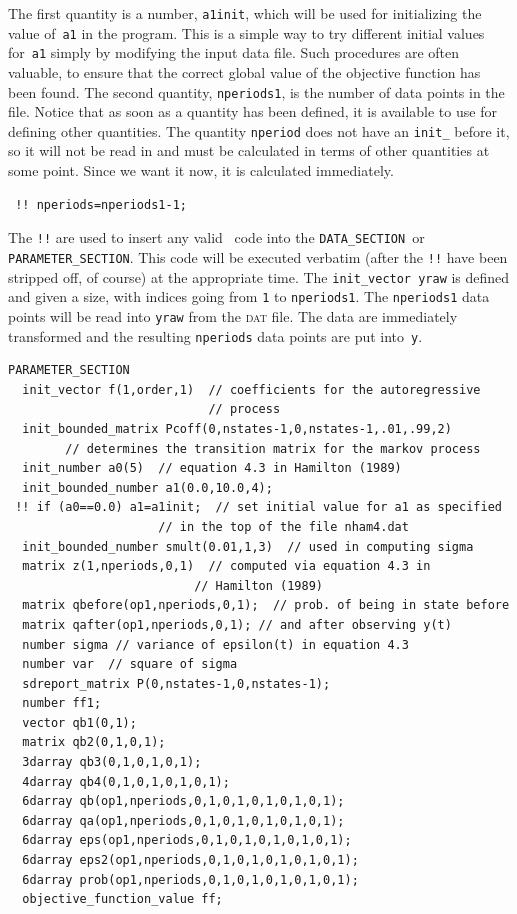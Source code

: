 \documentclass{admbmanual}
\newcommand\DS{\texttt{DATA\_SECTION}}
\newcommand\PS{\texttt{PARAMETER\_SECTION}}
\begin{document}
The first quantity is a number, \texttt{a1init}, which will be used for
initializing the value of~\texttt{a1} in the program. This is a simple way to
try different initial values for~\texttt{a1} simply by modifying the input data
file. Such procedures are often valuable, to ensure that the correct global
value of the objective function has been found. The second quantity,
\texttt{nperiods1}, is the number of data points in the file. Notice that as
soon as a quantity has been defined, it is available to use for defining other
quantities. The quantity \texttt{nperiod} does not have an \texttt{init\_}
before it, so it will not be read in and must be calculated in terms of other
quantities at some point. Since we want it now, it is calculated immediately.
\begin{lstlisting}
 !! nperiods=nperiods1-1;
\end{lstlisting}
The \texttt{!!} are used to insert any valid \cplus\ code into the \DS\ or
\PS. %
This code will be executed verbatim (after the \texttt{!!} have been stripped
off, of course) at the appropriate time. The \texttt{init\_vector yraw} is
defined and given a size, with indices going from \texttt{1} to
\texttt{nperiods1}. The \texttt{nperiods1} data points will be read into
\texttt{yraw} from the \textsc{dat} file. The data are immediately transformed
and the resulting \texttt{nperiods} data points are put into~\texttt{y}.
\begin{lstlisting}
PARAMETER_SECTION
  init_vector f(1,order,1)  // coefficients for the autoregressive
                            // process
  init_bounded_matrix Pcoff(0,nstates-1,0,nstates-1,.01,.99,2)
        // determines the transition matrix for the markov process
  init_number a0(5)  // equation 4.3 in Hamilton (1989)
  init_bounded_number a1(0.0,10.0,4);
 !! if (a0==0.0) a1=a1init;  // set initial value for a1 as specified
                     // in the top of the file nham4.dat
  init_bounded_number smult(0.01,1,3)  // used in computing sigma
  matrix z(1,nperiods,0,1)  // computed via equation 4.3 in
                          // Hamilton (1989)
  matrix qbefore(op1,nperiods,0,1);  // prob. of being in state before
  matrix qafter(op1,nperiods,0,1); // and after observing y(t)
  number sigma // variance of epsilon(t) in equation 4.3
  number var  // square of sigma
  sdreport_matrix P(0,nstates-1,0,nstates-1);
  number ff1;
  vector qb1(0,1);
  matrix qb2(0,1,0,1);
  3darray qb3(0,1,0,1,0,1);
  4darray qb4(0,1,0,1,0,1,0,1);
  6darray qb(op1,nperiods,0,1,0,1,0,1,0,1,0,1);
  6darray qa(op1,nperiods,0,1,0,1,0,1,0,1,0,1);
  6darray eps(op1,nperiods,0,1,0,1,0,1,0,1,0,1);
  6darray eps2(op1,nperiods,0,1,0,1,0,1,0,1,0,1);
  6darray prob(op1,nperiods,0,1,0,1,0,1,0,1,0,1);
  objective_function_value ff;
\end{lstlisting}
\end{document}

